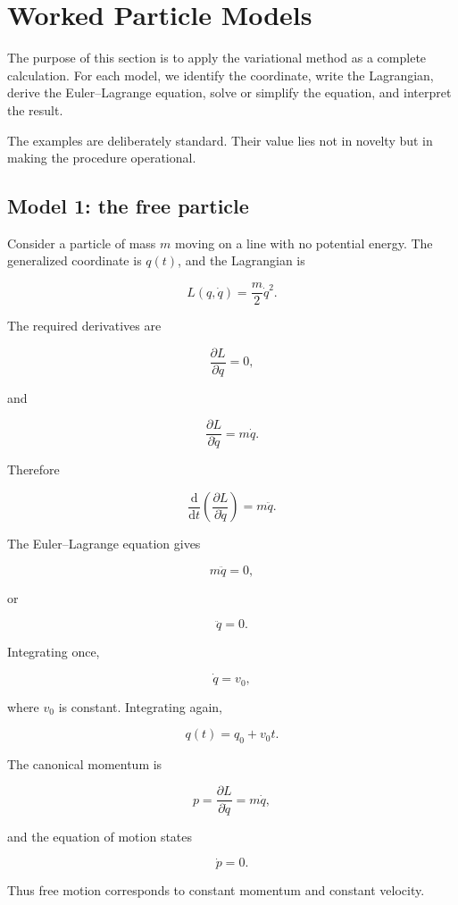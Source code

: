 \section{Worked Particle Models}
\label{sec:worked_particle_models}

The purpose of this section is to apply the variational method as a complete calculation. For each model, we identify the coordinate, write the Lagrangian, derive the Euler--Lagrange equation, solve or simplify the equation, and interpret the result.

The examples are deliberately standard. Their value lies not in novelty but in making the procedure operational.

\subsection{Model 1: the free particle}

Consider a particle of mass \(m\) moving on a line with no potential energy. The generalized coordinate is \(q(t)\), and the Lagrangian is

\[
L(q,\dot q)
=
\frac{m}{2}\dot q^{2}.
\]

The required derivatives are

\[
\frac{\partial L}{\partial q}=0,
\]

and

\[
\frac{\partial L}{\partial\dot q}
=
m\dot q.
\]

Therefore

\[
\frac{\mathrm{d}}{\mathrm{d}t}
\left(
\frac{\partial L}{\partial\dot q}
\right)
=
m\ddot q.
\]

The Euler--Lagrange equation gives

\[
m\ddot q=0,
\]

or

\[
\boxed{
\ddot q=0
}.
\]

Integrating once,

\[
\dot q=v_{0},
\]

where \(v_{0}\) is constant. Integrating again,

\[
\boxed{
q(t)=q_{0}+v_{0}t
}.
\]

The canonical momentum is

\[
p
=
\frac{\partial L}{\partial\dot q}
=
m\dot q,
\]

and the equation of motion states

\[
\dot p=0.
\]

Thus free motion corresponds to constant momentum and constant velocity.

